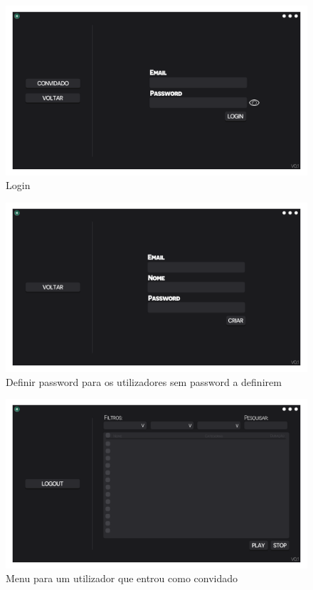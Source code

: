 \documentclass[a4paper]{report}
\begin{document}
\begin{figure}[H]
	\centering 
    \includegraphics[width=\textwidth]{images/Login_Menu.png}  
    \caption{Login}
\end{figure}

\begin{figure}[H]
	\centering 
    \includegraphics[width=\textwidth]{images/DefinirPassword_Menu.png}  
    \caption{Definir password para os utilizadores sem password a definirem}
\end{figure}

\begin{figure}[H]
	\centering 
    \includegraphics[width=\textwidth]{images/Principal_convidado_Menu.png}  
    \caption{Menu para um utilizador que entrou como convidado}
\end{figure}
\end{document}
